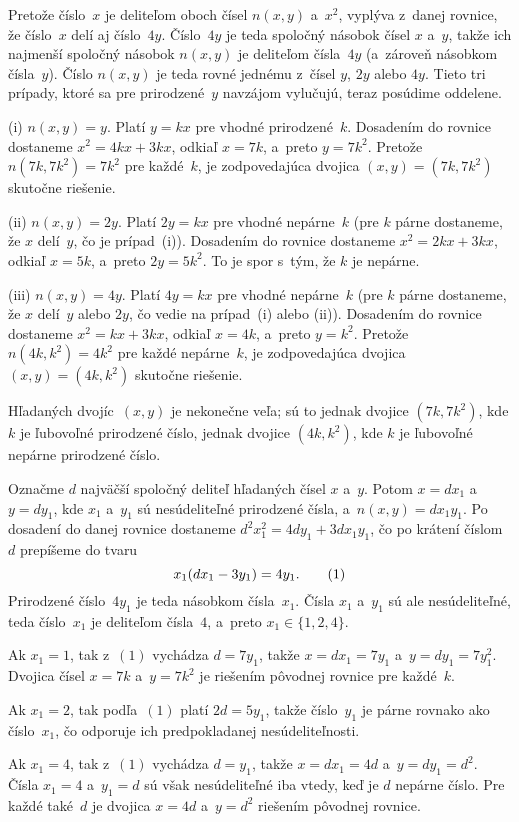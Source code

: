 {%
Pretože číslo~$x$ je deliteľom oboch čísel $n(x,y)$
a~$x^2$, vyplýva z~danej rovnice, že číslo~$x$ delí aj číslo~$4y$.
Číslo~$4y$ je teda spoločný násobok čísel $x$ a~$y$, takže ich
najmenší spoločný násobok $n(x,y)$ je deliteľom čísla~$4y$
(a~zároveň násobkom čísla~$y$). Číslo $n(x,y)$ je teda rovné
jednému z~čísel $y$, $2y$ alebo $4y$. Tieto tri prípady, ktoré sa pre
prirodzené~$y$ navzájom vylučujú, teraz posúdime oddelene.

(i) $n(x,y)=y$. Platí $y=kx$ pre vhodné prirodzené~$k$. Dosadením
do rovnice dostaneme
$x^2=4kx+3kx$, odkiaľ $x=7k$, a~preto $y=7k^2$. Pretože
$n(7k,7k^2)=7k^2$ pre každé~$k$, je zodpovedajúca
dvojica $(x,y)=(7k,7k^2)$ skutočne riešenie.

(ii) $n(x,y)=2y$. Platí $2y=kx$ pre vhodné nepárne~$k$ (pre
$k$ párne dostaneme, že $x$ delí~$y$, čo je prípad~(i)).
Dosadením do rovnice dostaneme $x^2=2kx+3kx$, odkiaľ $x=5k$,
a~preto $2y=5k^2$. To je spor s~tým, že $k$ je nepárne.

(iii) $n(x,y)=4y$. Platí $4y=kx$ pre vhodné nepárne~$k$ (pre $k$
párne dostaneme, že $x$ delí~$y$ alebo $2y$, čo vedie na
prípad~(i) alebo (ii)). Dosadením do rovnice dostaneme
$x^2=kx+3kx$, odkiaľ $x=4k$, a~preto $y=k^2$. Pretože
$n(4k,k^2)=4k^2$ pre každé nepárne~$k$, je zodpovedajúca dvojica
$(x,y)=(4k,k^2)$ skutočne riešenie.

\odpoved
Hľadaných dvojíc~$(x,y)$ je nekonečne veľa; sú
to jednak dvojice $(7k,7k^2)$, kde $k$ je ľubovoľné prirodzené
číslo, jednak dvojice $(4k,k^2)$, kde $k$ je ľubovoľné nepárne
prirodzené číslo.

\ineriesenie
Označme $d$ najväčší spoločný deliteľ hľadaných
čísel $x$ a~$y$. Potom $x=dx_1$ a~$y=dy_1$, kde $x_1$ a~$y_1$
sú nesúdeliteľné prirodzené čísla, a~$n(x,y)=dx_1y_1$. Po dosadení
do danej rovnice dostaneme $d^2x_1^2=4dy_1+3dx_1y_1$, čo po
krátení číslom~$d$ prepíšeme do tvaru
$$
x_1(dx_1-3y_1)=4y_1.
\tag1
$$
Prirodzené číslo~$4y_1$ je teda násobkom čísla~$x_1$.
Čísla $x_1$ a~$y_1$ sú ale nesúdeliteľné, teda číslo~$x_1$
je deliteľom čísla~$4$, a~preto $x_1\in\{1,2,4\}$.

Ak $x_1=1$, tak z~$(1)$ vychádza $d=7y_1$,
takže $x=dx_1=7y_1$ a~$y=dy_1=7y_1^2$. Dvojica čísel
$x=7k$ a~$y=7k^2$ je riešením pôvodnej rovnice pre každé~$k$.

Ak $x_1=2$, tak podľa~$(1)$ platí $2d=5y_1$, takže
číslo~$y_1$ je párne rovnako ako číslo~$x_1$, čo odporuje
ich predpokladanej nesúdeliteľnosti.

Ak $x_1=4$, tak z~$(1)$ vychádza $d=y_1$,
takže $x=dx_1=4d$ a~$y=dy_1=d^2$. Čísla $x_1=4$ a~$y_1=d$ sú
však nesúdeliteľné iba vtedy, keď je $d$ nepárne číslo. Pre každé také~$d$
je dvojica $x=4d$ a~$y=d^2$ riešením pôvodnej rovnice.}


